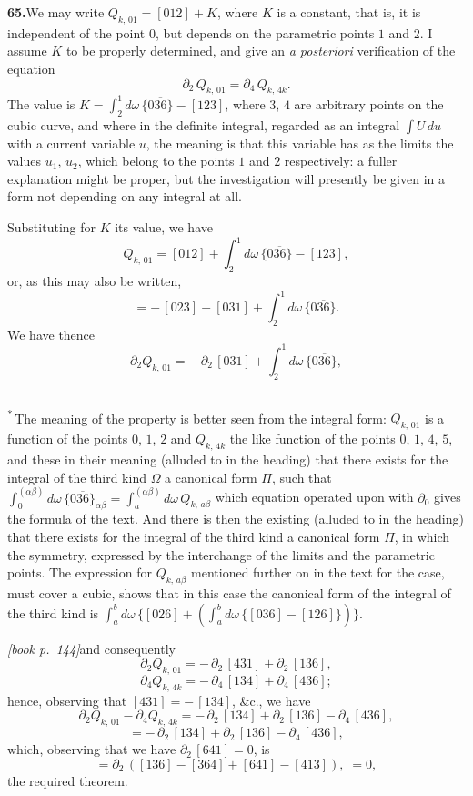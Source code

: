 \documentclass[11pt,a4paper]{article}
\theoremstyle{plain}
\theoremstyle{definition}
\theoremstyle{remark}
\providecommand{\bdet}[1]{\overline{#1}}
\begin{document}
\medskip\noindent\textbf{65.}\quad We may write $Q_{k,\,01} = [012] + K$, where $K$ is a constant, that is, it is independent of the point $0$, but depends on the parametric points $1$ and $2$. I assume $K$ to be properly determined, and give an \textit{a posteriori} verification of the equation
\[
\partial_2\,Q_{k,\,01} = \partial_4\,Q_{k,\,4k}.
\]
The value is $K = \int_2^1 d\omega\,\bigl\{0\bdet{36}\bigr\} - [123]$, where $3$, $4$ are arbitrary points on the cubic curve, and where in the definite integral, regarded as an integral $\int U\,du$ with a current variable $u$, the meaning is that this variable has as the limits the values $u_1$, $u_2$, which belong to the points $1$ and $2$ respectively: a fuller explanation might be proper, but the investigation will presently be given in a form not depending on any integral at all.

Substituting for $K$ its value, we have
\[
Q_{k,\,01} = [012] + \int_2^1 d\omega\,\bigl\{0\bdet{36}\bigr\} - [123],
\]
or, as this may also be written,
\[
= -\,[023] - [031] + \int_2^1 d\omega\,\bigl\{0\bdet{36}\bigr\}.
\]
We have thence
\[
\partial_2 Q_{k,\,01} = -\,\partial_2\,[031] + \int_2^1 d\omega\,\bigl\{0\bdet{36}\bigr\},
\]
\bigskip
\hrule
\smallskip
\noindent\textsuperscript{*}\,The meaning of the property is better seen from the integral form: $Q_{k,\,01}$ is a function of the points $0$, $1$, $2$ and $Q_{k,\,4k}$ the like function of the points $0$, $1$, $4$, $5$, and these in their meaning (alluded to in the heading) that there exists for the integral of the third kind $\Omega$ a canonical form $\Pi$, such that $\int_0^{(\alpha\beta)} d\omega\, \bigl\{0\bdet{36}\bigr\}_{\alpha\beta} = \int_a^{(\alpha\beta)} d\omega\, Q_{k,\,a\beta}$ which equation operated upon with $\partial_0$ gives the formula of the text. And there is then the existing (alluded to in the heading) that there exists for the integral of the third kind a canonical form $\Pi$, in which the symmetry, expressed by the interchange of the limits and the parametric points. The expression for $Q_{k,\,a\beta}$ mentioned further on in the text for the case, must cover a cubic, shows that in this case the canonical form of the integral of the third kind is $\int_a^b d\omega\,\bigl\{[026] + \left(\int_a^b d\omega\,\{[036] - [126]\}\right)\bigr\}$.

\medskip\noindent\textit{[book p.~144]}\quad and consequently
\[
\partial_2 Q_{k,\,01} = -\,\partial_2\,[431] + \partial_2\,[136],
\]
\[
\partial_4 Q_{k,\,4k} = -\,\partial_4\,[134] + \partial_4\,[436];
\]
hence, observing that $[431] = -\,[134]$, \&c., we have
\[
\partial_2 Q_{k,\,01} - \partial_4 Q_{k,\,4k} = -\,\partial_2\,[134] + \partial_2\,[136] - \partial_4\,[436],
\]
\[
= -\,\partial_2\,[134] + \partial_2\,[136] - \partial_4\,[436],
\]
which, observing that we have $\partial_2\,[641] = 0$, is
\[
= \partial_2\,([136] - [364] + [641] - [413]),\;= 0,
\]
the required theorem.
\end{document}
